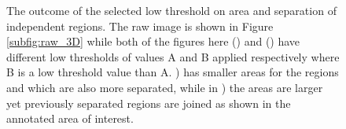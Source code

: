 \begin{figure}
    \centering
    \caption[The outcome of the selected low threshold on area and separation of independent regions]{The outcome of the selected low threshold on area and separation of independent regions. The raw image is shown in Figure \ref{subfig:raw_3D} while both of the figures here () and () have different low thresholds of values A and B applied respectively where B is a low threshold value than A. ) has smaller areas for the regions and which are also more separated, while in ) the areas are larger yet previously separated regions are joined as shown in the annotated area of interest.}
    \label{fig:my_label}
\end{figure}
\fi
